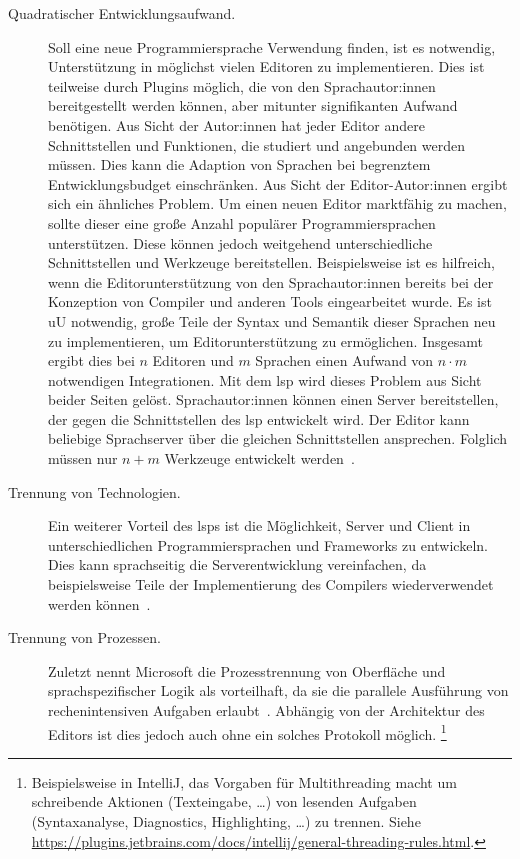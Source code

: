\begin{description}
    \item[Quadratischer Entwicklungsaufwand.]
    Soll eine neue Programmiersprache Verwendung finden, ist es notwendig, Unterstützung in möglichst vielen Editoren zu implementieren.
    Dies ist teilweise durch Plugins möglich, die von den Sprachautor:innen bereitgestellt werden können, aber mitunter signifikanten Aufwand benötigen.
    Aus Sicht der Autor:innen hat jeder Editor andere Schnittstellen und Funktionen, die studiert und angebunden werden müssen.
    Dies kann die Adaption von Sprachen bei begrenztem Entwicklungsbudget einschränken.
    Aus Sicht der Editor-Autor:innen ergibt sich ein ähnliches Problem.
    Um einen neuen Editor marktfähig zu machen, sollte dieser eine große Anzahl populärer Programmiersprachen unterstützen.
    Diese können jedoch weitgehend unterschiedliche Schnittstellen und Werkzeuge bereitstellen.
    Beispielsweise ist es hilfreich, wenn die Editorunterstützung von den Sprachautor:innen bereits bei der Konzeption von Compiler und anderen Tools eingearbeitet wurde.
    Es ist \ac{uU} notwendig, große Teile der Syntax und Semantik dieser Sprachen neu zu implementieren, um Editorunterstützung zu ermöglichen.
    Insgesamt ergibt dies bei $n$ Editoren und $m$ Sprachen einen Aufwand von $n \cdot m$ notwendigen Integrationen.
    Mit dem \ac{lsp} wird dieses Problem aus Sicht beider Seiten gelöst.
    Sprachautor:innen können einen Server bereitstellen, der gegen die Schnittstellen des \ac{lsp} entwickelt wird.
    Der Editor kann beliebige Sprachserver über die gleichen Schnittstellen ansprechen.
    Folglich müssen nur $n + m$ Werkzeuge entwickelt werden~\cite{why-lsp}.
    \item[Trennung von Technologien.]
    Ein weiterer Vorteil des \acp{lsp} ist die Möglichkeit, Server und Client in unterschiedlichen Programmiersprachen und Frameworks zu entwickeln.
    Dies kann sprachseitig die Serverentwicklung vereinfachen, da beispielsweise Teile der Implementierung des Compilers wiederverwendet werden können~\cite{why-lsp}.
    \item[Trennung von Prozessen.]
    Zuletzt nennt Microsoft die Prozesstrennung von Oberfläche und sprachspezifischer Logik als vorteilhaft, da sie die parallele Ausführung von rechenintensiven Aufgaben erlaubt~\cite{why-lsp}.
    Abhängig von der Architektur des Editors ist dies jedoch auch ohne ein solches Protokoll möglich.
    \footnote{Beispielsweise in IntelliJ, das Vorgaben für Multithreading macht um schreibende Aktionen (Texteingabe, \ldots) von lesenden Aufgaben (Syntaxanalyse, Diagnostics, Highlighting, \ldots) zu trennen. Siehe \url{https://plugins.jetbrains.com/docs/intellij/general-threading-rules.html}.}
\end{description}

